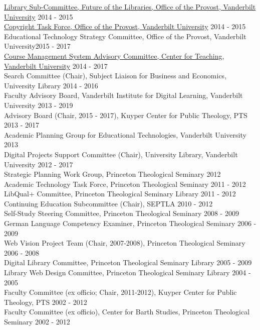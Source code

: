 \documentclass[10pt]{res} %
\begin{document}
\begin{resume}
\href{https://www.library.vanderbilt.edu/future/}{Library Sub-Committee, Future of the Libraries, Office of the Provost, Vanderbilt University} \hfill 2014 - 2015 \\
\href{http://news.vanderbilt.edu/2015/09/new-videos-on-copyright-law-help-users- balance-fair-use-considerations/}{Copyright Task Force, Office of the Provost, Vanderbilt University} \hfill 2014 - 2015 \\
Educational Technology Strategy Committee, Office of the Provost, Vanderbilt University\hfill 2015 - 2017 \\
\href{https://www.vanderbilt.edu/blackboard/about/advisory-committee/}{Course Management System Advisory Committee, Center for Teaching, Vanderbilt University} \hfill 2014 - 2017 \\
Search Committee (Chair), Subject Liaison for Business and Economics, University Library \hfill 2014 - 2016 \\
Faculty Advisory Board, Vanderbilt Institute for Digital Learning, Vanderbilt University \hfill 2013 - 2019 \\
Advisory Board (Chair, 2015 - 2017), Kuyper Center for Public Theology, PTS \hfill 2013 - 2017 \\
Academic Planning Group for Educational Technologies, Vanderbilt University \hfill 2013 \\
Digital Projects Support Committee (Chair), University Library, Vanderbilt University \hfill 2012 - 2017 \\
Strategic Planning Work Group, Princeton Theological Seminary \hfill 2012 \\
Academic Technology Task Force, Princeton Theological Seminary \hfill 2011 - 2012 \\
LibQual+ Committee, Princeton Theological Seminary Library \hfill 2011 - 2012 \\
Continuing Education Subcommittee (Chair), SEPTLA \hfill 2010 - 2012 \\
Self-Study Steering Committee, Princeton Theological Seminary  \hfill 2008 - 2009 \\
German Language Competency Examiner, Princeton Theological Seminary \hfill 2006 - 2009 \\
Web Vision Project Team (Chair, 2007-2008), Princeton Theological Seminary \hfill 2006 - 2008 \\
Digital Library Committee, Princeton Theological Seminary Library \hfill 2005 - 2009 \\
Library Web Design Committee, Princeton Theological Seminary Library \hfill 2004 - 2005 \\
Faculty Committee (ex officio; Chair, 2011-2012), Kuyper Center for Public Theology, PTS \hfill 2002 - 2012 \\
Faculty Committee (ex officio), Center for Barth Studies, Princeton Theological Seminary  \hfill 2002 - 2012


\end{resume}
\end{document}
